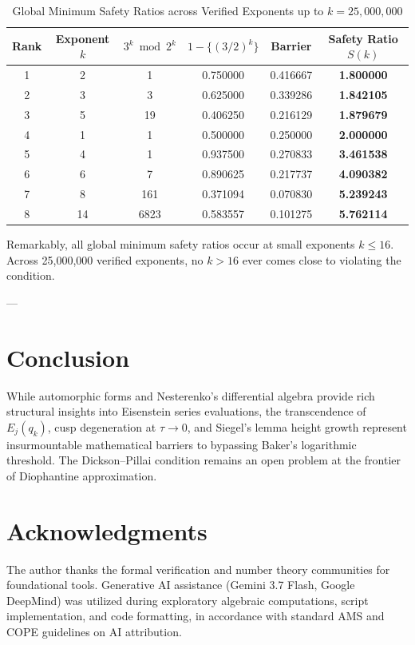 \documentclass[11pt,reqno]{amsart}
\theoremstyle{definition}
\numberwithin{equation}{section}
\begin{document}
\begin{table}[ht]
\centering
\caption{Global Minimum Safety Ratios across Verified Exponents up to $k = 25{,}000{,}000$}
\label{tab:safety_ratios}
\begin{tabular}{@{}cccccc@{}}
\toprule
Rank & Exponent $k$ & $3^k \bmod 2^k$ & $1 - \{(3/2)^k\}$ & Barrier & Safety Ratio $S(k)$ \\ \midrule
1 & 2 & 1 & 0.750000 & 0.416667 & \textbf{1.800000} \\
2 & 3 & 3 & 0.625000 & 0.339286 & \textbf{1.842105} \\
3 & 5 & 19 & 0.406250 & 0.216129 & \textbf{1.879679} \\
4 & 1 & 1 & 0.500000 & 0.250000 & \textbf{2.000000} \\
5 & 4 & 1 & 0.937500 & 0.270833 & \textbf{3.461538} \\
6 & 6 & 7 & 0.890625 & 0.217737 & \textbf{4.090382} \\
7 & 8 & 161 & 0.371094 & 0.070830 & \textbf{5.239243} \\
8 & 14 & 6823 & 0.583557 & 0.101275 & \textbf{5.762114} \\ \bottomrule
\end{tabular}
\end{table}

Remarkably, all global minimum safety ratios occur at small exponents $k \le 16$. Across 25,000,000 verified exponents, no $k > 16$ ever comes close to violating the condition.

---

\section{Conclusion}
While automorphic forms and Nesterenko's differential algebra provide rich structural insights into Eisenstein series evaluations, the transcendence of $E_j(q_k)$, cusp degeneration at $\tau \to 0$, and Siegel's lemma height growth represent insurmountable mathematical barriers to bypassing Baker's logarithmic threshold. The Dickson--Pillai condition remains an open problem at the frontier of Diophantine approximation.

\section*{Acknowledgments}
The author thanks the formal verification and number theory communities for foundational tools. Generative AI assistance (Gemini 3.7 Flash, Google DeepMind) was utilized during exploratory algebraic computations, script implementation, and code formatting, in accordance with standard AMS and COPE guidelines on AI attribution.
\end{document}
